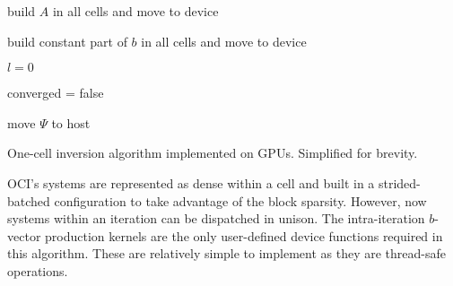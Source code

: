 \begin{algorithm}
    build $A$ in all cells and move to device

    build constant part of $b$ in all cells and move to device

    $l = 0$ 

    converged = false

    
    move $\Psi$ to host
    
    \caption{One-cell inversion algorithm implemented on GPUs. Simplified for brevity.}
    \label{alg:ocigpu}
\end{algorithm}

OCI's systems are represented as dense within a cell and built in a strided-batched configuration to take advantage of the block sparsity.
However, now systems within an iteration can be dispatched in unison.
The intra-iteration $b$-vector production kernels are the only user-defined device functions required in this algorithm. These are relatively simple to implement as they are thread-safe operations.

